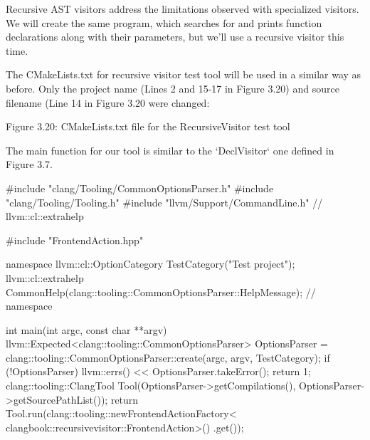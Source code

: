 Recursive AST visitors address the limitations observed with specialized visitors. We will create the same program, which searches for and prints function declarations along with their parameters, but we’ll use a recursive visitor this time.

The CMakeLists.txt for recursive visitor test tool will be used in a similar way as before. Only the project name (Lines 2 and 15-17 in Figure 3.20) and source filename (Line 14 in Figure 3.20 were changed:


\begin{center}
Figure 3.20: CMakeLists.txt file for the RecursiveVisitor test tool
\end{center}

The main function for our tool is similar to the ‘DeclVisitor‘ one defined in Figure 3.7.

\begin{cpp}
#include "clang/Tooling/CommonOptionsParser.h"
#include "clang/Tooling/Tooling.h"
#include "llvm/Support/CommandLine.h" // llvm::cl::extrahelp

#include "FrontendAction.hpp"

namespace {
llvm::cl::OptionCategory TestCategory("Test project");
llvm::cl::extrahelp
  CommonHelp(clang::tooling::CommonOptionsParser::HelpMessage);
} // namespace

int main(int argc, const char **argv) {
  llvm::Expected<clang::tooling::CommonOptionsParser> OptionsParser =
    clang::tooling::CommonOptionsParser::create(argc, argv, TestCategory);
  if (!OptionsParser) {
    llvm::errs() << OptionsParser.takeError();
    return 1;
  }
  clang::tooling::ClangTool Tool(OptionsParser->getCompilations(),
                                 OptionsParser->getSourcePathList());
  return Tool.run(clang::tooling::newFrontendActionFactory<
                    clangbook::recursivevisitor::FrontendAction>()
                    .get());
}
\end{cpp}

